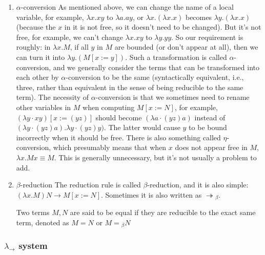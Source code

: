 \documentclass[a4paper]{exam}
\begin{document}
\begin{enumerate}
  \item $\alpha$-conversion
        As mentioned above, we can change the name of a local variable, for example, $\lambda x . x y$ to $\lambda a . a y$, or $\lambda x . (\lambda x . x)$ becomes $\lambda y . (\lambda x . x)$ (because the $x$ in it is not free, so it doesn't need to be changed). But it's not free, for example, we can't change $\lambda x . x y$ to $\lambda y . y y$.
        So our requirement is roughly: in $\lambda x . M$, if all $y$ in $M$ are bounded (or don't appear at all), then we can turn it into $\lambda y . (M[x:=y])$. Such a transformation is called $\alpha$-conversion, and we generally consider the terms that can be transformed into each other by $\alpha$-conversion to be the same (syntactically equivalent, i.e., three, rather than equivalent in the sense of being reducible to the same term).
        The necessity of $\alpha$-conversion is that we sometimes need to rename other variables in $M$ when computing $M[x:=N]$, for example, $(\lambda y \cdot x y)[x:=(y z)]$ should become $(\lambda a \cdot(y z) a)$ instead of $(\lambda y \cdot(y z) a). \lambda y \cdot(y z) y)$. The latter would cause $y$ to be bound incorrectly when it should be free.
        There is also something called $\eta$-conversion, which presumably means that when $x$ does not appear free in $M$, $\lambda x . M x \equiv M$. This is generally unnecessary, but it's not usually a problem to add.
  \item $\beta$-reduction
        The reduction rule is called $\beta$-reduction, and it is also simple: $(\lambda x . M) N \rightarrow M[x:=N]$. Sometimes it is also written as $\twoheadrightarrow{ } _ {\beta}$.

        Two terms $M, N$ are said to be equal if they are reducible to the exact same term, denoted as $M=N$ or $M={ } _ {\beta} N$
\end{enumerate}

\subsubsection{$\lambda_\to$ system \cite{barendregt1992lambda}}
\end{document}
